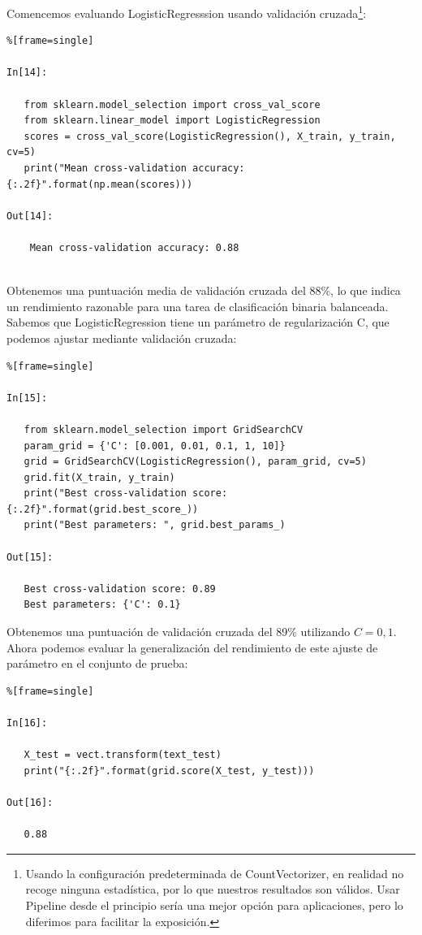 Comencemos evaluando {\ttfamily LogisticRegresssion} usando validación cruzada\footnote{Usando la configuración predeterminada de {\ttfamily  CountVectorizer}, en realidad no recoge ninguna estadística, por lo que nuestros resultados son válidos. Usar Pipeline desde el principio sería una mejor opción para aplicaciones, pero lo diferimos para facilitar la exposición.}:


\begin{lstlisting}%[frame=single]

In[14]:

   from sklearn.model_selection import cross_val_score
   from sklearn.linear_model import LogisticRegression
   scores = cross_val_score(LogisticRegression(), X_train, y_train, cv=5)
   print("Mean cross-validation accuracy: {:.2f}".format(np.mean(scores)))

Out[14]:
    
    Mean cross-validation accuracy: 0.88
    
\end{lstlisting}

Obtenemos una puntuación media de validación cruzada del 88\%,  lo que indica un rendimiento 
razonable para una tarea de clasificación binaria balanceada. Sabemos que {\ttfamily LogisticRegression} 
tiene un parámetro de regularización C, que podemos ajustar mediante validación cruzada:

\begin{lstlisting}%[frame=single]

In[15]:

   from sklearn.model_selection import GridSearchCV
   param_grid = {'C': [0.001, 0.01, 0.1, 1, 10]}
   grid = GridSearchCV(LogisticRegression(), param_grid, cv=5)
   grid.fit(X_train, y_train)
   print("Best cross-validation score: {:.2f}".format(grid.best_score_))
   print("Best parameters: ", grid.best_params_)

Out[15]:
   
   Best cross-validation score: 0.89
   Best parameters: {'C': 0.1}

\end{lstlisting}

Obtenemos una puntuación de validación cruzada del 89\% utilizando $C = 0,1$. 
Ahora podemos evaluar la generalización del rendimiento de este ajuste de parámetro en el conjunto de prueba:


\begin{lstlisting}%[frame=single]

In[16]:

   X_test = vect.transform(text_test)
   print("{:.2f}".format(grid.score(X_test, y_test)))

Out[16]:

   0.88

\end{lstlisting}

